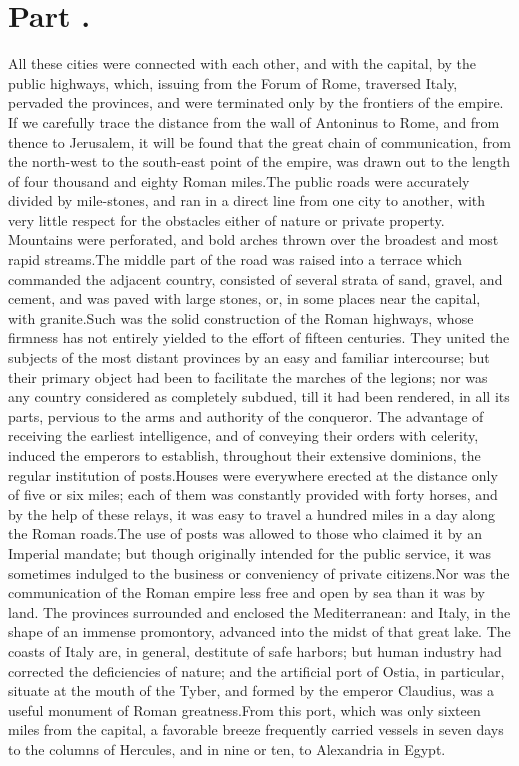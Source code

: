\section{Part \thesection.}
\thispagestyle{simple}

All these cities were connected with each other, and with the
capital, by the public highways, which, issuing from the Forum of
Rome, traversed Italy, pervaded the provinces, and were
terminated only by the frontiers of the empire. If we carefully
trace the distance from the wall of Antoninus to Rome, and from
thence to Jerusalem, it will be found that the great chain of
communication, from the north-west to the south-east point of the
empire, was drawn out to the length of four thousand and eighty
Roman miles.\footnotemark[85] The public roads were accurately divided by
mile-stones, and ran in a direct line from one city to another,
with very little respect for the obstacles either of nature or
private property. Mountains were perforated, and bold arches
thrown over the broadest and most rapid streams.\footnotemark[86] The middle
part of the road was raised into a terrace which commanded the
adjacent country, consisted of several strata of sand, gravel,
and cement, and was paved with large stones, or, in some places
near the capital, with granite.\footnotemark[87] Such was the solid
construction of the Roman highways, whose firmness has not
entirely yielded to the effort of fifteen centuries. They united
the subjects of the most distant provinces by an easy and
familiar intercourse; but their primary object had been to
facilitate the marches of the legions; nor was any country
considered as completely subdued, till it had been rendered, in
all its parts, pervious to the arms and authority of the
conqueror. The advantage of receiving the earliest intelligence,
and of conveying their orders with celerity, induced the emperors
to establish, throughout their extensive dominions, the regular
institution of posts.\footnotemark[88] Houses were everywhere erected at the
distance only of five or six miles; each of them was constantly
provided with forty horses, and by the help of these relays, it
was easy to travel a hundred miles in a day along the Roman
roads.\footnotemark[89] \footnotemark[891] The use of posts was allowed to those who claimed
it by an Imperial mandate; but though originally intended for the
public service, it was sometimes indulged to the business or
conveniency of private citizens.\footnotemark[90] Nor was the communication of
the Roman empire less free and open by sea than it was by land.
The provinces surrounded and enclosed the Mediterranean: and
Italy, in the shape of an immense promontory, advanced into the
midst of that great lake. The coasts of Italy are, in general,
destitute of safe harbors; but human industry had corrected the
deficiencies of nature; and the artificial port of Ostia, in
particular, situate at the mouth of the Tyber, and formed by the
emperor Claudius, was a useful monument of Roman greatness.\footnotemark[91]
From this port, which was only sixteen miles from the capital, a
favorable breeze frequently carried vessels in seven days to the
columns of Hercules, and in nine or ten, to Alexandria in Egypt.\footnotemark[92]


